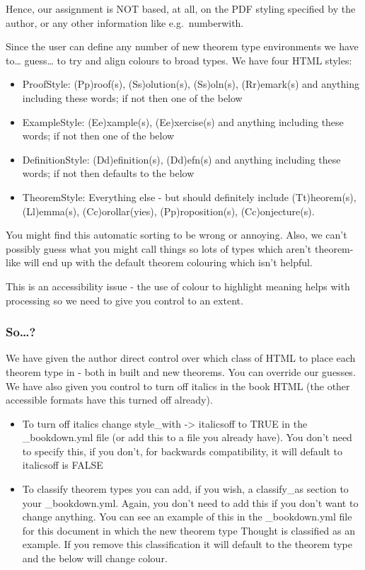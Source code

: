\documentclass[
  12pt,
  a4paper]{extarticle}
\providecommand{\tightlist}{%
  \setlength{\itemsep}{0pt}\setlength{\parskip}{0pt}}
\theoremstyle{plain}
\theoremstyle{definition}
\theoremstyle{plain}
\theoremstyle{plain}
\theoremstyle{plain}
\theoremstyle{plain}
\theoremstyle{definition}
\theoremstyle{definition}
\theoremstyle{remark}
\theoremstyle{remark}
\renewcommand{\;}{\,}
\begin{document}
Hence, our assignment is NOT based, at all, on the PDF styling specified by the author, or any other information like e.g.~numberwith.

Since the user can define any number of new theorem type environments we have to\ldots{} guess\ldots{} to try and align colours to broad types. We have four HTML styles:

\begin{itemize}
\tightlist
\item
  ProofStyle: (P\textbar p)roof(s), (S\textbar s)olution(s), (S\textbar s)oln(s), (R\textbar r)emark(s) and anything including these words; if not then one of the below
\item
  ExampleStyle: (E\textbar e)xample(s), (E\textbar e)xercise(s) and anything including these words; if not then one of the below
\item
  DefinitionStyle: (D\textbar d)efinition(s), (D\textbar d)efn(s) and anything including these words; if not then defaults to the below
\item
  TheoremStyle: Everything else - but should definitely include (T\textbar t)heorem(s), (L\textbar l)emma(s), (C\textbar c)orollar(y\textbar ies), (P\textbar p)roposition(s), (C\textbar c)onjecture(s).
\end{itemize}

You might find this automatic sorting to be wrong or annoying. Also, we can't possibly guess what you might call things so lots of types which aren't theorem-like will end up with the default theorem colouring which isn't helpful.

This is an accessibility issue - the use of colour to highlight meaning helps with processing so we need to give you control to an extent.

\hypertarget{so}{%
\subsubsection{So\ldots?}\label{so}}

We have given the author direct control over which class of HTML to place each theorem type in - both in built and new theorems. You can override our guesses. We have also given you control to turn off italics in the book HTML (the other accessible formats have this turned off already).

\begin{itemize}
\tightlist
\item
  To turn off italics change style\_with -\textgreater{} italicsoff to TRUE in the \_bookdown.yml file (or add this to a file you already have). You don't need to specify this, if you don't, for backwards compatibility, it will default to italicsoff is FALSE
\item
  To classify theorem types you can add, if you wish, a classify\_as section to your \_bookdown.yml. Again, you don't need to add this if you don't want to change anything. You can see an example of this in the \_bookdown.yml file for this document in which the new theorem type Thought is classified as an example. If you remove this classification it will default to the theorem type and the below will change colour.
\end{itemize}
\end{document}
